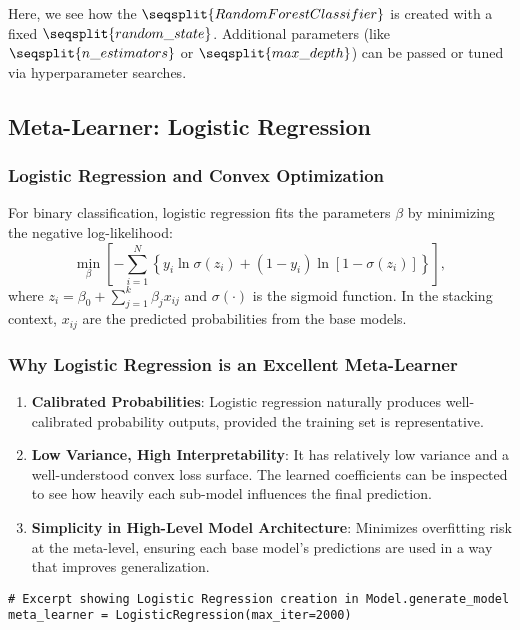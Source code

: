 \documentclass[12pt]{article}
\begin{document}
\noindent Here, we see how the \(\seqsplit{RandomForestClassifier}\) is created with a fixed \(\seqsplit{random\_state}\). Additional parameters (like \(\seqsplit{n\_estimators}\) or \(\seqsplit{max\_depth}\)) can be passed or tuned via hyperparameter searches.

\subsection{Meta-Learner: Logistic Regression}

\subsubsection{Logistic Regression and Convex Optimization}
For binary classification, logistic regression fits the parameters \(\beta\) by minimizing the negative log-likelihood:
\[
\min_{\beta} \left[ -\sum_{i=1}^N \left\{ y_i \ln \sigma(z_i) + (1 - y_i)\ln [1 - \sigma(z_i)] \right\} \right],
\]
where \(z_i = \beta_0 + \sum_{j=1}^k \beta_j x_{ij}\) and \(\sigma(\cdot)\) is the sigmoid function. In the stacking context, \(x_{ij}\) are the predicted probabilities from the base models.

\subsubsection{Why Logistic Regression is an Excellent Meta-Learner}
\begin{enumerate}[label=\arabic*)]
    \item \textbf{Calibrated Probabilities}: Logistic regression naturally produces well-calibrated probability outputs, provided the training set is representative.
    \item \textbf{Low Variance, High Interpretability}: It has relatively low variance and a well-understood convex loss surface. The learned coefficients can be inspected to see how heavily each sub-model influences the final prediction.
    \item \textbf{Simplicity in High-Level Model Architecture}: Minimizes overfitting risk at the meta-level, ensuring each base model’s predictions are used in a way that improves generalization.
\end{enumerate}

\begin{verbatim}
# Excerpt showing Logistic Regression creation in Model.generate_model
meta_learner = LogisticRegression(max_iter=2000)
\end{verbatim}
\end{document}

